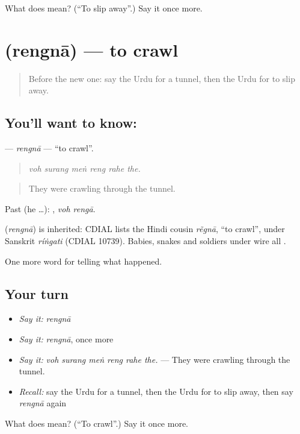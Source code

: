 \begin{tcolorbox}[breakable,colback=teal!4,colframe=teal!35!black,title={Before you move on}]
What does  mean? (\textquotedblleft{}To slip away\textquotedblright{}.) Say it once more.
\end{tcolorbox}
\section[\texorpdfstring{\ur{رینگنا} (rengnā)}{رینگنا (rengnā)}]{ (rengnā) — to crawl}

\label{lesson:UR-C316-rengna}



\begin{quote}
Before the new one: say the Urdu for a tunnel, then the Urdu for to slip away.
\end{quote}

\subsection*{You'll want to know: }
\textbf{} — \emph{rengnā} — \textquotedblleft{}to crawl\textquotedblright{}.

\begin{quote}
     
\end{quote}

\begin{quote}
\emph{voh surang meṅ reng rahe the.}
\end{quote}

\begin{quote}
They were crawling through the tunnel.
\end{quote}

Past (he …):  , \emph{voh rengā}.

\begin{cousinweb}
\textbf{} (\emph{rengnā}) is inherited: CDIAL lists the Hindi cousin \emph{rẽgnā}, \textquotedblleft{}to crawl\textquotedblright{}, under Sanskrit \emph{ríṅgati} (CDIAL 10739). Babies, snakes and soldiers under wire all \textbf{ }.
\end{cousinweb}

\begin{grammarlens}[title={What you've built}]
One more word for telling what happened.
\end{grammarlens}

\subsection*{Your turn}
\begin{itemize}
\raggedright
  \item \emph{Say it:} \emph{rengnā}
  \item \emph{Say it:} \emph{rengnā}, once more
  \item \emph{Say it:} \emph{voh surang meṅ reng rahe the.} — They were crawling through the tunnel.
  \item \emph{Recall:} say the Urdu for a tunnel, then the Urdu for to slip away, then say \emph{rengnā} again
\end{itemize}

\begin{tcolorbox}[breakable,colback=teal!4,colframe=teal!35!black,title={Before you move on}]
What does  mean? (\textquotedblleft{}To crawl\textquotedblright{}.) Say it once more.
\end{tcolorbox}
